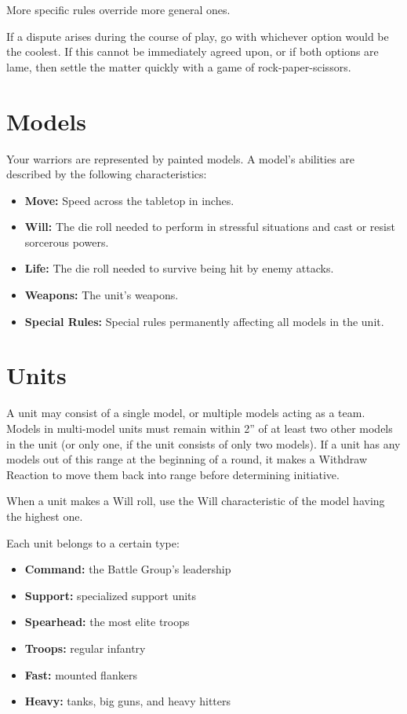\begin{multicols}{2}
More specific rules override more general ones.

If a dispute arises during the course of play, go with whichever option would be the coolest. If this cannot be immediately agreed upon, or if both options are lame, then settle the matter quickly with a game of rock-paper-scissors.




\section*{Models}

Your warriors are represented by painted models. A model's abilities are described by the following characteristics:
\begin{itemize}
    \item \textbf{Move:} Speed across the tabletop in inches.
    \item \textbf{Will:} The die roll needed to perform in stressful situations and cast or resist sorcerous powers.
    \item \textbf{Life:} The die roll needed to survive being hit by enemy attacks.
    \item \textbf{Weapons:} The unit's weapons.
    \item \textbf{Special Rules:} Special rules permanently affecting all models in the unit.
\end{itemize}





\section*{Units}

A unit may consist of a single model, or multiple models acting as a team. Models in multi-model units must remain within 2'' of at least two other models in the unit (or only one, if the unit consists of only two models). If a unit has any models out of this range at the beginning of a round, it makes a Withdraw Reaction to move them back into range before determining initiative.

When a unit makes a Will roll, use the Will characteristic of the model having the highest one.

Each unit belongs to a certain type:

\begin{itemize}
    \item \textbf{Command:} the Battle Group's leadership
    \item \textbf{Support:} specialized support units
    \item \textbf{Spearhead:} the most elite troops
    \item \textbf{Troops:} regular infantry
    \item \textbf{Fast:} mounted flankers
    \item \textbf{Heavy:} tanks, big guns, and heavy hitters
\end{itemize}





\end{multicols}
